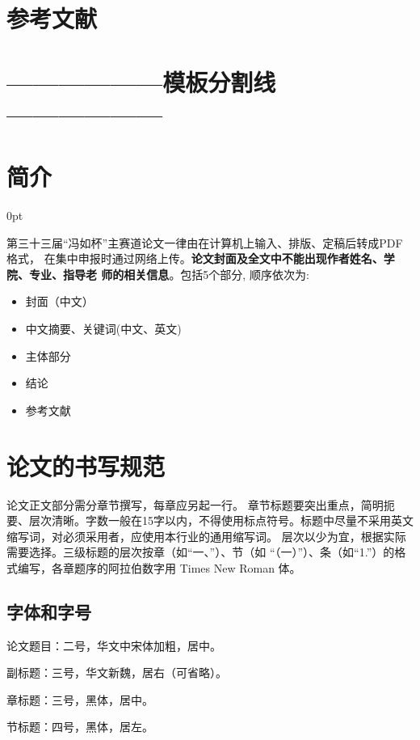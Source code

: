 \documentclass[zihao=-4]{ctexart}
\newcommand{\setParDis}{\setlength {\parskip} {0pt} }
\begin{document}
\section{参考文献}



\section{——————模板分割线——————}
\section{简介}
\setParDis %
\begin{spacing}{1.5}
  第三十三届“冯如杯”主赛道论文一律由在计算机上输入、排版、定稿后转成PDF格式，
在集中申报时通过网络上传。\textbf{论文封面及全文中不能出现作者姓名、学院、专业、指导老
师的相关信息}。包括5个部分, 顺序依次为: \par 
  \begin{itemize}
    \item 封面（中文）
    \item 中文摘要、关键词(中文、英文)
    \item 主体部分
    \item 结论
    \item 参考文献
  \end{itemize}

\section{论文的书写规范}

论文正文部分需分章节撰写，每章应另起一行。
章节标题要突出重点，简明扼要、层次清晰。字数一般在15字以内，不得使用标点符号。标题中尽量不采用英文缩写词，对必须采用者，应使用本行业的通用缩写词。  层次以少为宜，根据实际需要选择。三级标题的层次按章（如“一、”）、节（如 “（一）”）、条（如“1.”）的格式编写，各章题序的阿拉伯数字用 Times New Roman 体。  

\subsection{字体和字号}
论文题目：二号，华文中宋体加粗，居中。

副标题：三号，华文新魏，居右（可省略）。

章标题：三号，黑体，居中。

节标题：四号，黑体，居左。


\end{spacing}
\end{document}
